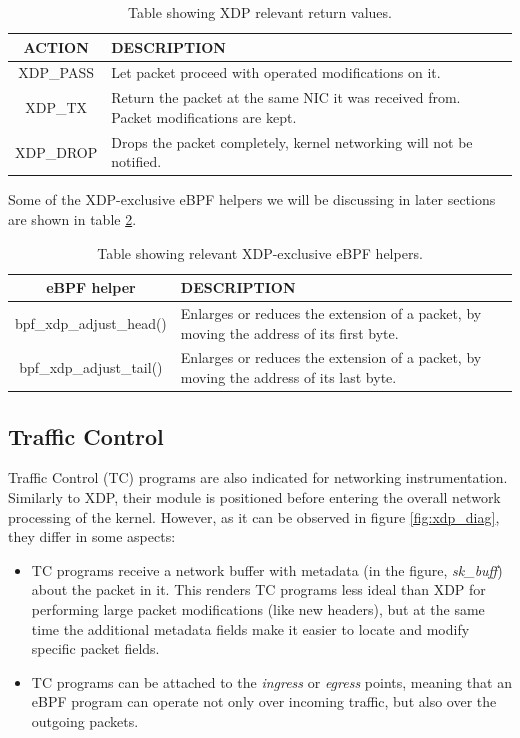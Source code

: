 \documentclass[12pt]{report} %
\begin{document}
\begin{table}[H]
\begin{tabular}{|c|>{\centering\arraybackslash}p{10cm}|}
\hline
ACTION & DESCRIPTION\\
\hline
\hline
XDP\_PASS & Let packet proceed with operated modifications on it.\\
\hline
XDP\_TX & Return the packet at the same NIC it was received from. Packet modifications are kept.\\
\hline
XDP\_DROP & Drops the packet completely, kernel networking will not be notified.\\
\hline
\end{tabular}
\caption{Table showing XDP relevant return values.}
\label{table:xdp_actions_av}
\end{table}

Some of the XDP-exclusive eBPF helpers we will be discussing in later sections are shown in table \ref{table:xdp_helpers}.
\begin{table}[H]
\begin{tabular}{|c|>{\centering\arraybackslash}p{10cm}|}
\hline
eBPF helper & DESCRIPTION\\
\hline
\hline
bpf\_xdp\_adjust\_head() & Enlarges or reduces the extension of a packet, by moving the address of its first byte.\\
\hline
bpf\_xdp\_adjust\_tail() & Enlarges or reduces the extension of a packet, by moving the address of its last byte.\\
\hline
\end{tabular}
\caption{Table showing relevant XDP-exclusive eBPF helpers.}
\label{table:xdp_helpers}
\end{table}


\subsection{Traffic Control}
Traffic Control (TC) programs are also indicated for networking instrumentation. Similarly to XDP, their module is positioned before entering the overall network processing of the kernel. However, as it can be observed in figure \ref{fig:xdp_diag}, they differ in some aspects:
\begin{itemize}
\item TC programs receive a network buffer with metadata (in the figure, \textit{sk\_buff}) about the packet in it. This renders TC programs less ideal than XDP for performing large packet modifications (like new headers), but at the same time the additional metadata fields make it easier to locate and modify specific packet fields\cite{tc_differences}.
\item TC programs can be attached to the \textit{ingress} or \textit{egress} points, meaning that an eBPF program can operate not only over incoming traffic, but also over the outgoing packets.
\end{itemize}
\end{document}
